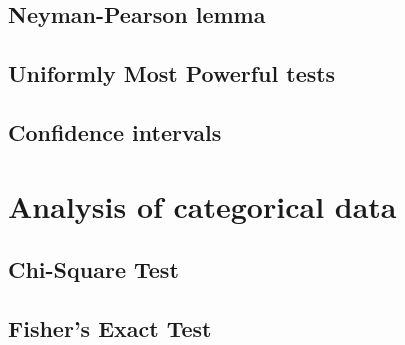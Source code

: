 \documentclass{article}
\begin{document}
\subsection{Neyman-Pearson lemma}
\subsection{Uniformly Most Powerful tests}
\subsection{Confidence intervals}

\section{Analysis of categorical data}
\subsection{Chi-Square Test}
\subsection{Fisher's Exact Test}
\end{document}
